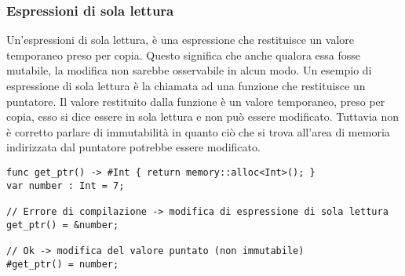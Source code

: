 \subsubsection{Espressioni di sola lettura}
Un'espressioni di sola lettura, è una espressione che restituisce un valore temporaneo preso per copia. Questo 
significa che anche qualora essa fosse mutabile, la modifica non sarebbe osservabile in alcun modo. Un esempio di 
espressione di sola lettura è la chiamata ad una funzione che restituisce un puntatore. Il valore restituito dalla 
funzione è un valore temporaneo, preso per copia, esso si dice essere in sola lettura e non può essere modificato.
Tuttavia non è corretto parlare di immutabilità in quanto ciò che si trova all'area di memoria indirizzata dal 
puntatore potrebbe essere modificato.

\vspace{0.5cm}
\begin{lstlisting}[frame=single]
func get_ptr() -> #Int { return memory::alloc<Int>(); }
var number : Int = 7;

// Errore di compilazione -> modifica di espressione di sola lettura
get_ptr() = &number;

// Ok -> modifica del valore puntato (non immutabile)
#get_ptr() = number;

\end{lstlisting}
\vspace{0.5cm}

